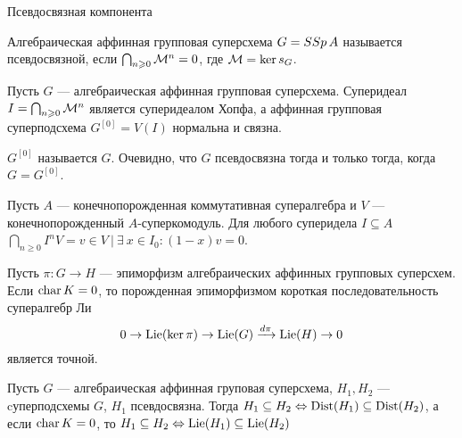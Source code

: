 \begin{subsection}{Псевдосвязная компонента}
  \begin{definition}
    Алгебраическая аффинная групповая суперсхема $ G = SSp\, A $ называется
    псевдосвязной, если $ \bigcap_{n \geqslant 0} \mathcal{M}^n = 0 $, где $ \mathcal{M} = \ker s_G $.
  \end{definition}

  \begin{lemma}
    Пусть $ G $ --- алгебраическая аффинная групповая суперсхема. Суперидеал
    $ I = \bigcap_{n \geqslant 0} \mathcal{M}^n $ является суперидеалом Хопфа, а
    аффинная групповая суперподсхема $ G^{[0]} = V(I) $ нормальна и связна.
    \begin{comment}
    \proof {
      По определению $ \mci_G(\M) = \M $.
      $$
        \mcm_G(\M^n) \subseteq \sum_{0 \leqslant i \leqslant} \M^i \o \M^{n-i}
        \subseteq \bigcap_{0 \leqslant i \leqslant} (\M^i \o A + A \o \M^{n-i})
      $$
      $$
        \mcm_G(I) \subseteq \bigcap_{n \geqslant 0} \mcm_A(\M^n) \subseteq
        \bigcap_{n \geqslant 0} (\M^n \o A + A \o \M^n) = I \o A + A \o I.
      $$
      \qedhere
    }
    \end{comment}
  \end{lemma}

  $ G^{[0]} $ называется  $ G $. Очевидно, что
  $ G $ псевдосвязна тогда и только тогда, когда $ G = G^{[0]} $.

  \begin{lemma}
    Пусть $ A $ --- конечнопорожденная коммутативная супералгебра и $ V $ ---
    конечнопорожденный $ A $-суперкомодуль. Для любого суперидела $ I \subseteq A $
    $ \bigcap_{n \geqslant 0} I^n V = {v \in V ~| ~\exists ~x \in I_0 : (1 - x)v = 0} $.
  \end{lemma}

  \begin{proposition}\label{exact sequence for Lie}
    Пусть $ \pi : G \to H $ --- эпиморфизм алгебраических аффинных групповых суперсхем.
    Если $ \mathop{\mathrm{char}}K = 0 $, то порожденная эпиморфизмом короткая последовательность
    супералгебр Ли
    $$ 0 \to \mathrm{Lie}(\ker\pi) \to \mathrm{Lie}(G) \xrightarrow{d\pi} \mathrm{Lie}(H) \to 0 $$
    является точной.
  \end{proposition}

  \begin{lemma}\label{subgroups iff Lie subalgebras}
    Пусть $ G $ --- алгебраическая аффинная груповая суперсхема, $ H_1, H_2 $ ---
    cуперподсхемы $ G $, $ H_1 $ псевдосвязна. Тогда
    $ H_1 \subseteq H_2 \Leftrightarrow \mathrm{Dist}(H_1) \subseteq \mathrm{Dist}(H_2) $, а если $ \mathop{\mathrm{char}}K = 0 $,
    то $ H_1 \subseteq H_2 \Leftrightarrow \mathrm{Lie}(H_1) \subseteq \mathrm{Lie}(H_2) $
  \end{lemma}


\end{subsection}
